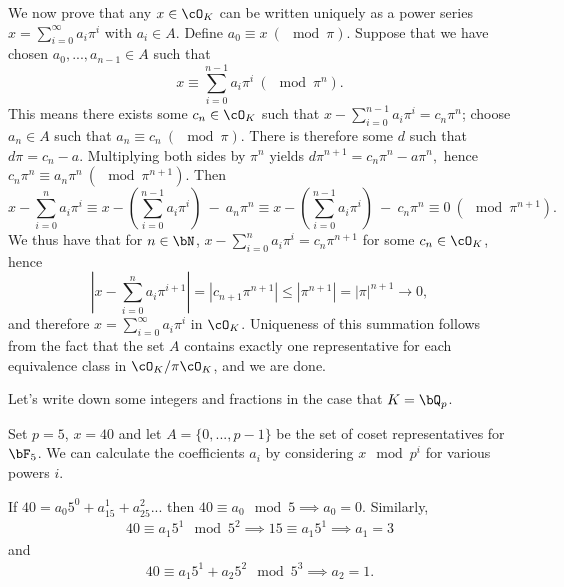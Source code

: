 \begin{prf}
	\bigskip
	
	We now prove that any $x \in \cO_K$ can be written uniquely as a power series $x = \sum_{i=0}^\infty a_i \pi^i$ with $a_i \in A$. Define $a_0 \equiv x ~ (\mod \pi)$. Suppose that we have chosen $a_0,...,a_{n-1} \in A$ such that
	\begin{equation*}
		x \equiv \sum_{i=0}^{n-1} a_i \pi^i  ~ (\mod \pi^{n}).
	\end{equation*}
	This means there exists some $c_n \in \cO_K$ such that $x - \sum_{i=0}^{n-1} a_i \pi^i = c_n \pi^n$; choose $a_n \in A$ such that $a_n \equiv c_n ~ (\mod \pi)$. There is therefore some $d$ such that $d\pi = c_n -a$. Multiplying both sides by $\pi^n$ yields $d\pi^{n+1} = c_n\pi^n - a\pi^n,$ hence $c_n\pi^n \equiv a_n\pi^n ~ (\mod \pi^{n+1})$. Then
	\begin{equation*}
		x - \sum_{i=0}^{n} a_i \pi^i \equiv x - \left(\sum_{i=0}^{n-1} a_i \pi^i\right) ~ -~ a_n\pi^n \equiv x - \left(\sum_{i=0}^{n-1} a_i \pi^i\right) ~ -~ c_n\pi^n \equiv 0 ~ (\mod \pi^{n+1}).
	\end{equation*}
	We thus have that for $n \in \bN$, $x - \sum_{i=0}^n a_i \pi^i = c_n\pi^{n+1}$ for some $c_n \in \cO_K$, hence
	\begin{equation*}
		\left|x - \sum_{i=0}^n a_i \pi^{i+1}\right| = \left|c_{n+1}\pi^{n+1}\right| \leq \left|\pi^{n+1}\right| = \left|\pi\right|^{n+1} \to 0, 
	\end{equation*}
	and therefore $x = \sum_{i=0}^{\infty}a_i \pi^i$ in $\cO_K$. Uniqueness of this summation follows from the fact that the set $A$ contains exactly one representative for each equivalence class in $\cO_K/\pi \cO_K$, and we are done.
\end{prf}
Let's write down some integers and fractions in the case that $K = \bQ_p$.
\begin{example}\label{example}
	Set $p = 5$, $x = 40$ and let $A = \{0,...,p-1\}$ be the set of coset representatives for $\bF_5$. We can calculate the coefficients $a_i$ by considering $x \mod p^i$ for various powers $i$.

If $40 = a_{0}5^0 + a_15^1 + a_{25}^2 ... $ then $40 \equiv a_0 \mod 5 \implies a_0 = 0$. Similarly,
\begin{align*}
	40 \equiv a_{1}5^1 \mod 5^2 \implies 15 \equiv a_{1}5^1 \implies a_1 = 3
\end{align*}
and 
\begin{align*}
	40 \equiv a_{1}5^1 + a_{2}5^2 \mod 5^3 \implies a_2 = 1.
\end{align*}
\end{example}
